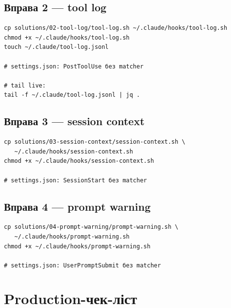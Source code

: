 \documentclass[11pt,a4paper]{article}
\begin{document}
\subsection{Вправа 2 --- tool log}

\begin{lstlisting}
cp solutions/02-tool-log/tool-log.sh ~/.claude/hooks/tool-log.sh
chmod +x ~/.claude/hooks/tool-log.sh
touch ~/.claude/tool-log.jsonl

# settings.json: PostToolUse без matcher

# tail live:
tail -f ~/.claude/tool-log.jsonl | jq .
\end{lstlisting}

\subsection{Вправа 3 --- session context}

\begin{lstlisting}
cp solutions/03-session-context/session-context.sh \
   ~/.claude/hooks/session-context.sh
chmod +x ~/.claude/hooks/session-context.sh

# settings.json: SessionStart без matcher
\end{lstlisting}

\subsection{Вправа 4 --- prompt warning}

\begin{lstlisting}
cp solutions/04-prompt-warning/prompt-warning.sh \
   ~/.claude/hooks/prompt-warning.sh
chmod +x ~/.claude/hooks/prompt-warning.sh

# settings.json: UserPromptSubmit без matcher
\end{lstlisting}

\section{Production-чек-ліст}
\end{document}
